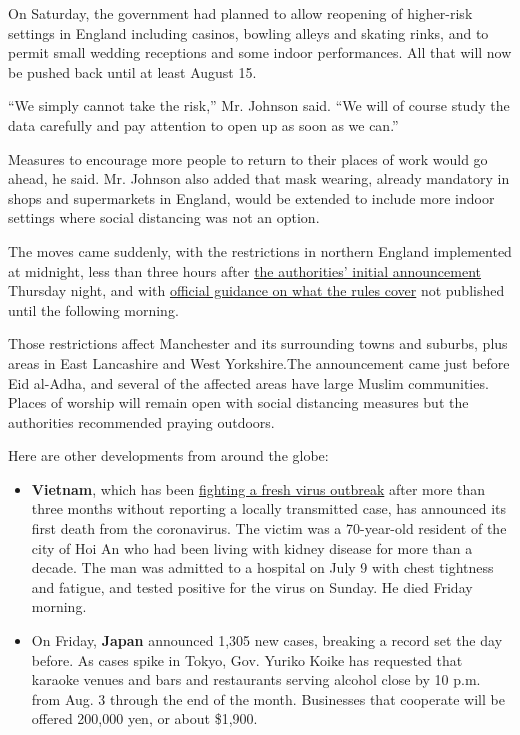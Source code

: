 On Saturday, the government had planned to allow reopening of
higher-risk settings in England including casinos, bowling alleys and
skating rinks, and to permit small wedding receptions and some indoor
performances. All that will now be pushed back until at least August 15.

``We simply cannot take the risk,'' Mr. Johnson said. ``We will of
course study the data carefully and pay attention to open up as soon as
we can.''

Measures to encourage more people to return to their places of work
would go ahead, he said. Mr. Johnson also added that mask wearing,
already mandatory in shops and supermarkets in England, would be
extended to include more indoor settings where social distancing was not
an option.

The moves came suddenly, with the restrictions in northern England
implemented at midnight, less than three hours after
\href{https://twitter.com/MattHancock/status/1288931464168591371}{the
authorities' initial announcement} Thursday night, and with
\href{https://www.gov.uk/guidance/north-west-of-england-local-restrictions-what-you-can-and-cannot-do}{official
guidance on what the rules cover} not published until the following
morning.

Those restrictions affect Manchester and its surrounding towns and
suburbs, plus areas in East Lancashire and West Yorkshire.The
announcement came just before Eid al-Adha, and several of the affected
areas have large Muslim communities. Places of worship will remain open
with social distancing measures but the authorities recommended praying
outdoors.

Here are other developments from around the globe:

\begin{itemize}
\tightlist
\item
  \textbf{Vietnam}, which has been
  \href{https://www.nytimes.com/2020/07/29/world/asia/coronavirus-vietnam.html}{fighting
  a fresh virus outbreak} after more than three months without reporting
  a locally transmitted case, has announced its first death from the
  coronavirus. The victim was a 70-year-old resident of the city of Hoi
  An who had been living with kidney disease for more than a decade. The
  man was admitted to a hospital on July 9 with chest tightness and
  fatigue, and tested positive for the virus on Sunday. He died Friday
  morning.
\end{itemize}

\begin{itemize}
\tightlist
\item
  On Friday, \textbf{Japan} announced 1,305 new cases, breaking a record
  set the day before. As cases spike in Tokyo, Gov. Yuriko Koike has
  requested that karaoke venues and bars and restaurants serving alcohol
  close by 10 p.m. from Aug. 3 through the end of the month. Businesses
  that cooperate will be offered 200,000 yen, or about \$1,900.
\end{itemize}

